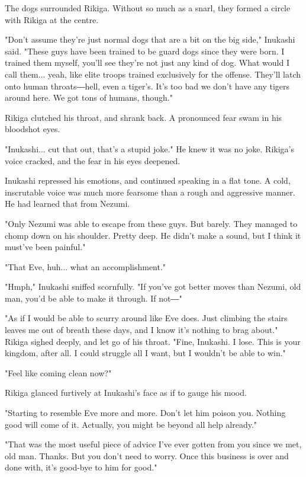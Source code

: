 The dogs surrounded Rikiga. Without so much as a snarl, they formed a
circle with Rikiga at the centre.

"Don't assume they're just normal dogs that are a bit on the big side,"
Inukashi said. "These guys have been trained to be guard dogs since they
were born. I trained them myself, you'll see they're not just any kind
of dog. What would I call them... yeah, like elite troops trained
exclusively for the offense. They'll latch onto human throats―hell, even
a tiger's. It's too bad we don't have any tigers around here. We got
tons of humans, though."

Rikiga clutched his throat, and shrank back. A pronounced fear swam in
his bloodshot eyes.

"Inukashi... cut that out, that's a stupid joke." He knew it was no
joke. Rikiga's voice cracked, and the fear in his eyes deepened.

Inukashi repressed his emotions, and continued speaking in a flat tone.
A cold, inscrutable voice was much more fearsome than a rough and
aggressive manner. He had learned that from Nezumi.

"Only Nezumi was able to escape from these guys. But barely. They
managed to chomp down on his shoulder. Pretty deep. He didn't make a
sound, but I think it must've been painful."

"That Eve, huh... what an accomplishment."

"Hmph," Inukashi sniffed scornfully. "If you've got better moves than
Nezumi, old man, you'd be able to make it through. If not―"

"As if I would be able to scurry around like Eve does. Just climbing the
stairs leaves me out of breath these days, and I know it's nothing to
brag about." Rikiga sighed deeply, and let go of his throat. "Fine,
Inukashi. I lose. This is your kingdom, after all. I could struggle all
I want, but I wouldn't be able to win."

"Feel like coming clean now?"

Rikiga glanced furtively at Inukashi's face as if to gauge his mood.

"Starting to resemble Eve more and more. Don't let him poison you.
Nothing good will come of it. Actually, you might be beyond all help
already."

"That was the most useful piece of advice I've ever gotten from you
since we met, old man. Thanks. But you don't need to worry. Once this
business is over and done with, it's good-bye to him for good."


